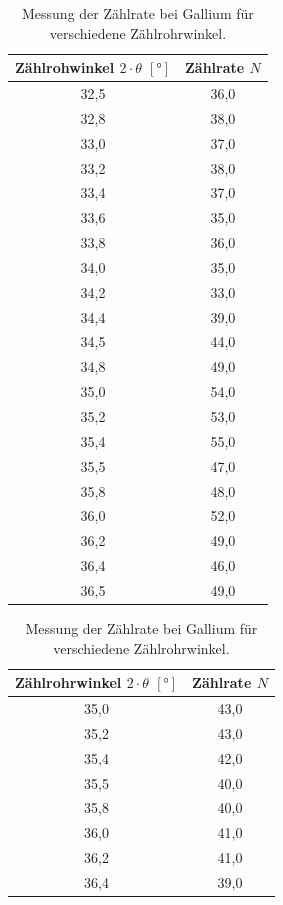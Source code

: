   \begin{table}[H]
  \begin{minipage}[c]{0.5\textwidth}
    \label{tab:gallium}
    \begin{tabular}{c|c}
      \textbf{Zählrohwinkel $2 \cdot \theta$ $[°]$} & \textbf{Zählrate $N$}\\
      \hline
      32,5	& 36,0 \\
      32,8	& 38,0 \\
      33,0	& 37,0 \\
      33,2	& 38,0 \\
      33,4	& 37,0 \\
      33,6	& 35,0 \\
      33,8	& 36,0 \\
      34,0	& 35,0 \\
      34,2	& 33,0 \\
      34,4	& 39,0 \\
      34,5	& 44,0 \\
      34,8	& 49,0 \\
      35,0	& 54,0 \\
      35,2	& 53,0 \\
      35,4	& 55,0 \\
      35,5	& 47,0 \\
      35,8	& 48,0 \\
      36,0	& 52,0 \\
      36,2	& 49,0 \\
      36,4	& 46,0 \\
      36,5	& 49,0
    \end{tabular}
    \captionsetup{width=7cm}
    \caption{Messung der Zählrate bei Gallium für verschiedene Zählrohrwinkel.}
  \end{minipage}
    \hfill
  \begin{minipage}[c]{0.5\textwidth}
    \label{tab:zink}
    \begin{tabular}{c|c}
        \textbf{Zählrohrwinkel $2 \cdot \theta$ $[°]$} & \textbf{Zählrate $N$}\\
      \hline
      35,0	& 43,0 \\
      35,2	& 43,0 \\
      35,4	& 42,0 \\
      35,5	& 40,0 \\
      35,8	& 40,0 \\
      36,0	& 41,0 \\
      36,2	& 41,0 \\
      36,4	& 39,0 \\

\end{tabular}
\end{minipage}
\end{table}
